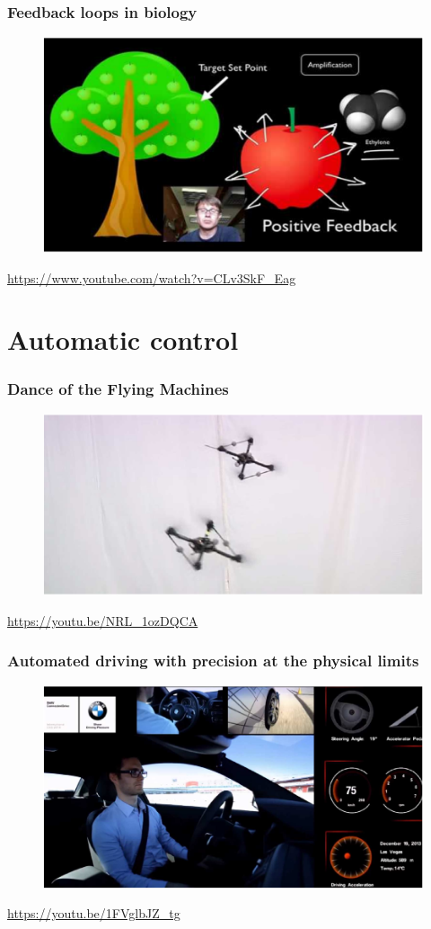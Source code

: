 \begin{frame}
	\frametitle{Feedback loops in biology}
	\begin{figure}
		\includegraphics[width=.9\linewidth]{feedback_biology}
	\end{figure}
	\url{https://www.youtube.com/watch?v=CLv3SkF_Eag}
\end{frame}

\section{Automatic control} 

\begin{frame}
	\frametitle{Dance of the Flying Machines}
	\begin{figure}
		\includegraphics[scale=.6]{flying_machines}
	\end{figure}
	\url{https://youtu.be/NRL_1ozDQCA}
\end{frame}

\begin{frame}
	\frametitle{Automated driving with precision at the physical limits}
	\begin{figure}
		\includegraphics[scale=.6]{autonomous_car}
	\end{figure}
	\url{https://youtu.be/1FVglbJZ_tg}
\end{frame}

